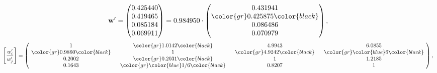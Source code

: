 \begin{example}
\begin{equation*}
\mathbf{w}^{\prime} =
\begin{pmatrix}
0.425440\\
0.419465\\
0.085184\\
0.069911
\end{pmatrix} =
0.984950\cdot
\begin{pmatrix}
0.431941\\
\color{gr} 0.425875\color{black} \\
0.086486\\
0.070979
\end{pmatrix},
\end{equation*}
\begin{equation*}
\left[ \frac{{w}^{\prime}_i}{{w}^{\prime}_j} \right] =
\begin{pmatrix}
$\,\,$ 1 $\,\,$ & $\,\,$\color{gr} 1.0142\color{black} $\,\,$ & $\,\,$4.9943$\,\,$ & $\,\,$6.0855$\,\,$ \\
$\,\,$\color{gr} 0.9860\color{black} $\,\,$ & $\,\,$ 1 $\,\,$ & $\,\,$\color{gr} 4.9242\color{black} $\,\,$ & $\,\,$\color{gr} \color{blue} 6\color{black}   $\,\,$ \\
$\,\,$0.2002$\,\,$ & $\,\,$\color{gr} 0.2031\color{black} $\,\,$ & $\,\,$ 1 $\,\,$ & $\,\,$1.2185 $\,\,$ \\
$\,\,$0.1643$\,\,$ & $\,\,$\color{gr} \color{blue}  1/6\color{black} $\,\,$ & $\,\,$0.8207$\,\,$ & $\,\,$ 1  $\,\,$ \\
\end{pmatrix},
\end{equation*}
\end{example}
\newpage
